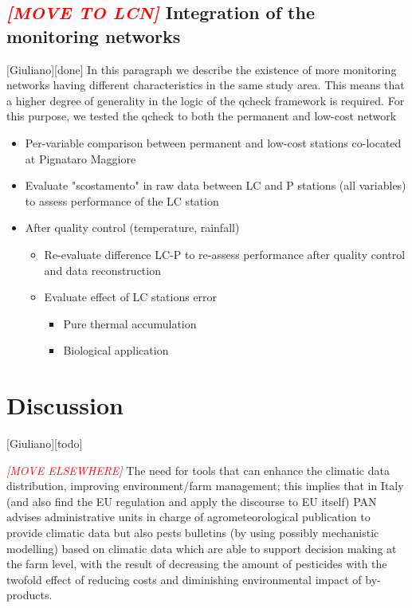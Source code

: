 \documentclass[authoryear,preprint,review,12pt]{elsarticle}
\newcommand{\note}[1]{\emph{\textcolor{red}{#1}}}
\begin{document}
\subsection{\note{[MOVE TO LCN]} Integration of the monitoring networks\label{Integration}}[Giuliano][done]
In this paragraph we describe the existence of more monitoring networks having different characteristics in the same study area.
This means that a higher degree of generality in the logic of the qcheck framework is required.
For this purpose, we tested the qcheck to both the permanent and low-cost network
\begin{itemize}
    \item Per-variable comparison between permanent and low-cost stations co-located at Pignataro Maggiore
    \item Evaluate "scostamento" in raw data between LC and P stations (all variables) to assess performance of the LC station
    \item After quality control (temperature, rainfall)
    \begin{itemize}
        \item Re-evaluate difference LC-P to re-assess performance after quality control and data reconstruction 
        \item Evaluate effect of LC stations error
        \begin{itemize}
            \item Pure thermal accumulation
            \item Biological application
        \end{itemize}
    \end{itemize}
\end{itemize}

\section{Discussion}[Giuliano][todo]

\note{[MOVE ELSEWHERE]} The need for tools that can enhance the climatic data distribution, improving environment/farm management; this implies that in Italy (and also find the EU regulation and apply the discourse to EU itself) PAN advises administrative units in charge of agrometeorological publication to provide climatic data but also pests bulletins (by using possibly mechanistic modelling) based on climatic data which are able to support decision making at the farm level, with the result of decreasing the amount of pesticides with the twofold effect of reducing costs and diminishing environmental impact of by-products.
\end{document}
